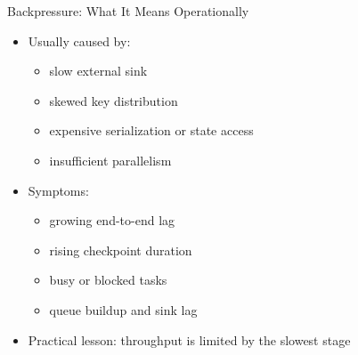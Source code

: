 \documentclass[aspectratio=169]{beamer}
\begin{document}
\begin{frame}{Backpressure: What It Means Operationally}
\small
\begin{itemize}
    \item Usually caused by:
    \begin{itemize}
        \item slow external sink
        \item skewed key distribution
        \item expensive serialization or state access
        \item insufficient parallelism
    \end{itemize}
    \item Symptoms:
    \begin{itemize}
        \item growing end-to-end lag
        \item rising checkpoint duration
        \item busy or blocked tasks
        \item queue buildup and sink lag
    \end{itemize}
    \item Practical lesson: throughput is limited by the slowest stage
\end{itemize}
\end{frame}
\end{document}
